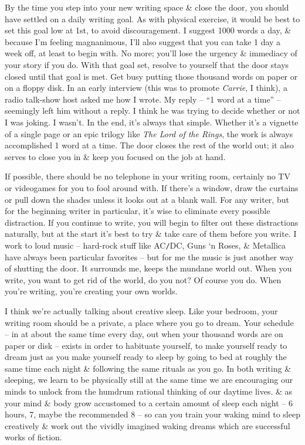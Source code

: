\documentclass{article}
\numberwithin{equation}{section}
\begin{document}
By the time you step into your new writing space \& close the door, you should have settled on a daily writing goal. As with physical exercise, it would be best to set this goal low at 1st, to avoid discouragement. I suggest 1000 words a day, \& because I'm feeling magnanimous, I'll also suggest that you can take 1 day a week off, at least to begin with. No more; you'll lose the urgency \& immediacy of your story if you do. With that goal set, resolve to yourself that the door stays closed until that goal is met. Get busy putting those thousand words on paper or on a floppy disk. In an early interview (this was to promote \textit{Carrie}, I think), a radio talk-show host asked me how I wrote. My reply -- ``1 word at a time'' -- seemingly left him without a reply. I think he was trying to decide whether or not I was joking. I wasn't. In the end, it's always that simple. Whether it's a vignette of a single page or an epic trilogy like \textit{The Lord of the Rings}, the work is always accomplished 1 word at a time. The door closes the rest of the world out; it also serves to close you in \& keep you focused on the job at hand.

If possible, there should be no telephone in your writing room, certainly no TV or videogames for you to fool around with. If there's a window, draw the curtains or pull down the shades unless it looks out at a blank wall. For any writer, but for the beginning writer in particular, it's wise to eliminate every possible distraction. If you continue to write, you will begin to filter out these distractions naturally, but at the start it's best to try \& take care of them before you write. I work to loud music -- hard-rock stuff like AC{\tt/}DC, Guns `n Roses, \& Metallica have always been particular favorites -- but for me the music is just another way of shutting the door. It surrounds me, keeps the mundane world out. When you write, you want to get rid of the world, do you not? Of course you do. When you're writing, you're creating your own worlds.

I think we're actually talking about creative sleep. Like your bedroom, your writing room should be a private, a place where you go to dream. Your schedule -- in at about the same time every day, out when your thousand words are on paper or disk -- exists in order to habituate yourself, to make yourself ready to dream just as you make yourself ready to sleep by going to bed at roughly the same time each night \& following the same rituals as you go. In both writing \& sleeping, we learn to be physically still at the same time we are encouraging our minds to unlock from the humdrum rational thinking of our daytime lives. \& as your mind \& body grow accustomed to a certain amount of sleep each night -- 6 hours, 7, maybe the recommended 8 -- so can you train your waking mind to sleep creatively \& work out the vividly imagined waking dreams which are successful works of fiction.
\end{document}
